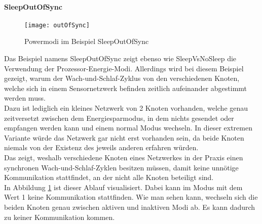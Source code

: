\paragraph{SleepOutOfSync}

\begin{figure}[htbp]
\centering
\caption{Powermodi im Beispiel SleepOutOfSync}
\label{fig:sleepOutOfSyncModes}
\texttt{[image: outOfSync]}
\end{figure}

Das Beispiel namens SleepOutOfSync zeigt ebenso wie SleepVsNoSleep die Verwendung der Prozessor-Energie-Modi. Allerdings wird bei diesem Beispiel gezeigt, warum der Wach-und-Schlaf-Zyklus von den verschiedenen Knoten, welche sich in einem Sensornetzwerk befinden zeitlich aufeinander abgestimmt werden muss.\\
Dazu ist lediglich ein kleines Netzwerk von 2 Knoten vorhanden, welche genau zeitversetzt zwischen dem Energiesparmodus, in dem nichts gesendet oder empfangen werden kann und einem normal Modus wechseln. In dieser extremen Variante würde das Netzwerk gar nicht erst vorhanden sein, da beide Knoten niemals von der Existenz des jeweils anderen erfahren würden.\\
Das zeigt, weshalb verschiedene Knoten eines Netzwerkes in der Praxis einen synchronen Wach-und-Schlaf-Zyklen besitzen müssen, damit keine unnötige Kommunikation stattfindet, an der nicht alle Knoten beteiligt sind.\\
In Abbildung \ref{fig:sleepOutOfSyncModes} ist dieser Ablauf visualisiert. Dabei kann im Modus mit dem Wert 1 keine Kommunikation stattfinden. Wie man sehen kann, wechseln sich die beiden Knoten genau zwischen aktiven und inaktiven Modi ab. Es kann dadurch zu keiner Kommunikation kommen.
